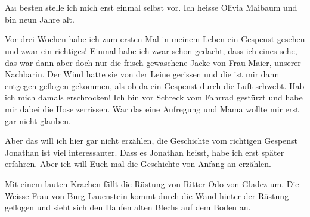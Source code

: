 \chapter*{}
\begin{mdframed}[style=mystyle]
\lettrine[lines=3]{\color{red}A}{m} besten stelle ich mich erst einmal selbst vor. Ich heisse Olivia Maibaum und bin neun Jahre alt. 

Vor drei Wochen habe ich zum ersten Mal in meinem Leben ein Gespenst gesehen und zwar ein richtiges! Einmal habe ich zwar schon gedacht, dass ich eines sehe, das war dann aber doch nur die frisch gewaschene Jacke von Frau Maier, unserer Nachbarin. Der Wind hatte sie von der Leine gerissen und die ist mir dann entgegen geflogen gekommen, als ob da ein Gespenst durch die Luft schwebt. Hab ich mich damals erschrocken! Ich bin vor Schreck vom Fahrrad gestürzt und habe mir dabei die Hose zerrissen.  War das eine Aufregung und Mama wollte mir erst gar nicht glauben.

Aber das will ich hier gar nicht erzählen, die Geschichte vom richtigen Gespenst Jonathan ist viel interessanter.  Dass es Jonathan heisst, habe ich erst später erfahren. Aber ich will Euch mal die Geschichte von Anfang an erzählen.
\end{mdframed}

Mit einem lauten Krachen fällt die Rüstung von Ritter Odo von Gladez um. Die Weisse Frau von Burg Lauenstein kommt durch die Wand hinter der Rüstung geflogen und sieht sich den Haufen alten Blechs auf dem Boden an.

